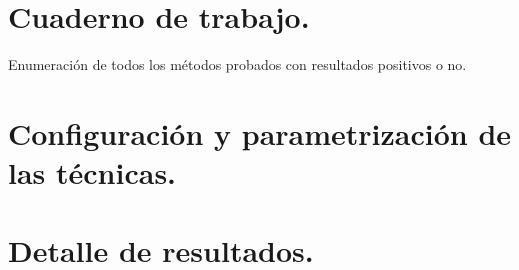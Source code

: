


\section{Cuaderno de trabajo.}

Enumeración de todos los métodos probados con resultados positivos o no.
\section{Configuración y parametrización de las técnicas.}

\section{Detalle de resultados.}